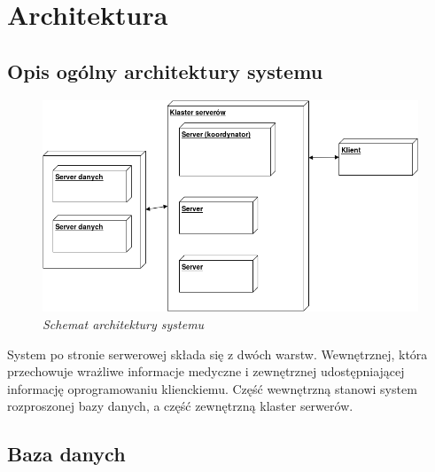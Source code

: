 \chapter{Architektura}

\section{Opis ogólny architektury systemu}

\begin{figure}[!h]
    \begin{center}
    \includegraphics[angle=0,scale=0.55]{img/arch.png}
    \end{center}
    \caption{\em Schemat architektury systemu}
    \label{fig:arch}
\end{figure}


System po stronie serwerowej składa się z dwóch warstw. Wewnętrznej, która przechowuje wrażliwe informacje medyczne i zewnętrznej udostępniającej informację oprogramowaniu klienckiemu. Część wewnętrzną stanowi system rozproszonej bazy danych, a część zewnętrzną klaster serwerów.

\section{Baza danych}

